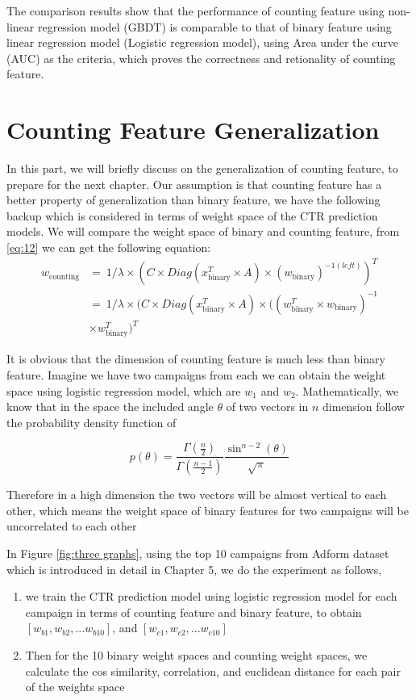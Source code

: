 The comparison results show that the performance of counting feature using non-linear regression model (GBDT) is comparable to that of binary feature using linear regression model (Logistic regression model), using Area under the curve (AUC) as the criteria, which proves the correctness and retionality of counting feature.

\section{Counting Feature Generalization}
In this part, we will briefly discuss on the generalization of counting feature, to prepare for the next chapter. Our assumption is that counting feature has a better property of generalization than binary feature, we have the following backup which is considered in terms of weight space of the CTR prediction models.
We will compare the weight space of binary and counting feature, from \ref{eq:12} we can get the following equation:
\begin{equation} \label{eq:28}
\begin{split}
w_{\text{counting}} & =\ 1/{\lambda} \times (C \times Diag(x_{\text{binary}}^T \times A) \times (w_{\text{binary}})^{-1(left)})^T \\
& = \ 1/{\lambda} \times (C \times Diag(x_{\text{binary}}^T \times A) \times ((w_{\text{binary}}^T \times w_{\text{binary}})^{-1} \\
& \times w_{\text{binary}}^T )^T
\end{split}
\end{equation} 

It is obvious that the dimension of counting feature is much less than binary feature. Imagine we have two campaigns from each we can obtain the weight space using logistic regression model, which are \(w_1\) and \(w_2\). Mathematically, we know that in the space the included angle \(\theta\) of two vectors in \(n\) dimension follow the probability density function of 

\begin{equation}
p(\theta)=\frac{\Gamma(\frac{n}{2})}{\Gamma(\frac{n-1}{2})}
\frac{\sin^{n-2}(\theta)}{\sqrt\pi}
\end{equation}

Therefore in a high dimension the two vectors will be almost vertical to each other, which means the weight space of binary features for two campaigns will be uncorrelated to each other

In Figure \ref{fig:three graphs}, using the top 10 campaigns from Adform dataset which is introduced in detail in Chapter 5, we do the experiment as follows,
\begin{enumerate}
\item we train the CTR prediction model using logistic regression model for each campaign in terms of counting feature and binary feature, to obtain \([w_{b1},w_{b2},...w_{b10}]\), and \([w_{c1},w_{c2},...w_{c10}]\)
\item Then for the 10 binary weight spaces and counting weight spaces, we calculate the cos similarity, correlation, and euclidean distance for each pair of the weights space
\end{enumerate}
 
